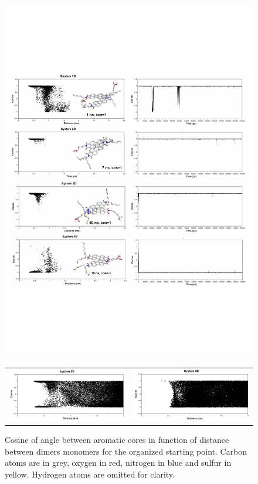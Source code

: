 \begin{figure}[p]
	\includegraphics[width=\columnwidth]{image/Figure7}
	\begin{tabular}{cc}
		\includegraphics[width=0.45\columnwidth]{image/Figure7b}&
		\includegraphics[width=0.45\columnwidth]{image/Figure7c} \\
	\end{tabular}
	\caption{Cosine of angle between aromatic cores in function of distance between dimers monomers for the organized starting point. Carbon atoms are in grey, oxygen in red, nitrogen in blue and sulfur in yellow. Hydrogen atoms are omitted for clarity.}
	\label{pap:fig09}
\end{figure}

